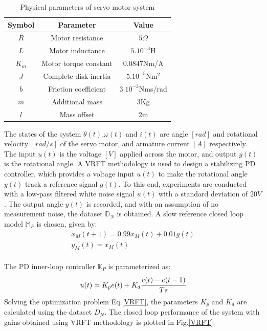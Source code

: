 \documentclass[letterpaper, 10 pt, conference]{ieeeconf}  %
\begin{document}
\begin{enumerate}
	\begin{table}[h!]
		\hspace{30pt}
		\begin{tabular}{||c|c|c||} 
			\hline
			Symbol & Parameter & Value\\ [0.5ex] 
			\hline\hline
			$R$ & Motor resistance & $5\Omega$ \\ 
			$L$ & Motor inductance & $5.10^{-3}$H \\
			$K_m$ & Motor torque constant & $0.0847$Nm/A \\
			$J$ & Complete disk inertia & $5.10^{-5}$Nm$^2$ \\
			$b$ & Friction coefficient & $3.10^{-3}$Nms/rad \\
			$m$ & Additional mass & $3$Kg \\
			$l$ & Mass offset & $2$m \\
			\hline
		\end{tabular}
		\caption{Physical parameters of servo motor system}
		\label{Simparam}
	\end{table}
	The states of the system $\theta(t)$,$\omega(t)$ and $i(t)$ are angle $[rad]$ and rotational velocity $[rad/s]$ of the servo motor, and armature current $[A]$ respectively. The input $u(t)$ is the voltage $[V]$ applied across the motor, and output $y(t)$ is the rotational angle. 
	A VRFT methodology is used to design a stabilizing PD controller, which provides a voltage input $u(t)$ to make the rotational angle $y(t)$ track a reference signal $g(t)$. To this end, experiments are conducted with a low-pass filtered white noise signal $u(t)$ with a standard deviation of $20V$. The output angle $y(t)$ is recorded, and with an assumption of no measurement noise, the dataset $\mathbb{D}_N$ is obtained. A slow reference closed loop model $\mathbb{M}_P$ is chosen, given by:
	\begin{equation*}
	\begin{matrix}
	x_M(t+1) = 0.99x_M(t) + 0.01g(t)\\
	y_M(t) = x_M(t)
	\end{matrix}
	\end{equation*}\\ 
	The PD inner-loop controller $\mathbb{K}_P$ is parameterized as:
	\begin{equation*}
	u(t) = K_pe(t) + K_d\cfrac{e(t)-e(t-1)}{Ts}
	\end{equation*} 
	Solving the optimization problem Eq.\eqref{VRFT}, the parameters 
	$K_p$ and $K_d$ are calculated using the dataset $D_N$. The closed loop performance of the system with gains obtained using VRFT methodology is plotted in Fig.\ref{VRFT}.

\end{enumerate}
\end{document}
